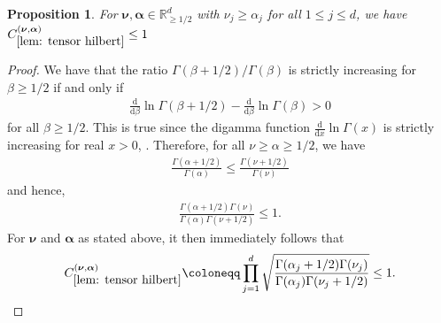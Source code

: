 \documentclass[pdflatex,sn-mathphys-num]{sn-jnl}%
\theoremstyle{thmstyleone}%
\newtheorem{proposition}{Proposition}%
\theoremstyle{thmstyletwo}%
\theoremstyle{thmstylethree}%
\begin{document}
\begin{proposition}\label{prop: bounded constant}
    For \(\boldsymbol{\nu},\boldsymbol{\alpha}\in\mathbb{R}^d_{\geq1/2}\) with \(\nu_j\geq\alpha_j\) for all \(1\leq j\leq d\), we have \(C^{(\boldsymbol{\nu},\boldsymbol{\alpha})}_{\ref{lem: tensor hilbert}}\leq1\)
\end{proposition}
\begin{proof}
    We have that the ratio \(\Gamma(\beta+1/2)/\Gamma(\beta)\) is strictly increasing for \(\beta\geq1/2\) if and only if
    \begin{align}
        \frac{\mathrm{d}}{\mathrm{d}\beta}\ln\Gamma(\beta+1/2)-\frac{\mathrm{d}}{\mathrm{d}\beta}\ln\Gamma(\beta)>0\nonumber
    \end{align}
    for all \(\beta\geq1/2\). This is true since the digamma function \(\frac{\mathrm{d}}{\mathrm{d}x}\ln\Gamma(x)\) is strictly increasing for real \(x>0\), \cite{Gautschi}. Therefore, for all \(\nu\geq\alpha\geq1/2\), we have
    \begin{align}
        \frac{\Gamma(\alpha+1/2)}{\Gamma(\alpha)} \leq\frac{\Gamma(\nu+1/2)}{\Gamma(\nu)}\nonumber
    \end{align}
    and hence,
    \begin{align}
        \frac{\Gamma(\alpha+1/2)\Gamma(\nu)}{\Gamma(\alpha)\Gamma(\nu+1/2)} \leq 1.\nonumber
    \end{align}
    For \(\boldsymbol{\nu}\) and \(\boldsymbol{\alpha}\) as stated above, it then immediately follows that
    \begin{align}
        C^{(\boldsymbol{\nu},\boldsymbol{\alpha})}_{\ref{lem: tensor hilbert}}\coloneqq \prod_{j=1}^d\sqrt{\frac{\Gamma(\alpha_j+1/2)\Gamma(\nu_j)}{\Gamma(\alpha_j)\Gamma(\nu_j+1/2)}}\leq1.\nonumber
    \end{align}
\end{proof}
\end{document}
